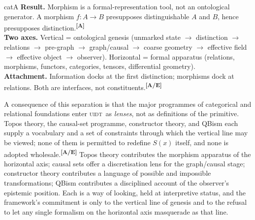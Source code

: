 \documentclass[12pt,a4paper,twoside]{article}
\theoremstyle{plain}
\theoremstyle{definition}
\theoremstyle{remark}
\newcommand{\UIDT}{\textsc{uidt}}
\newcommand{\catmark}[1]{\textsuperscript{\textsf{\textbf{[#1]}}}}
\begin{document}
\begin{evidencebox}{catA}
\textbf{Result.} Morphism is a formal-representation tool, not an ontological generator. A morphism $f\colon A\to B$ presupposes distinguishable $A$ and $B$,
hence presupposes distinction.\catmark{A}\\[0.3em]
\textbf{Two axes.} Vertical = ontological genesis (unmarked state $\to$ distinction $\to$ relations $\to$ pre-graph $\to$ graph/causal $\to$ coarse geometry $\to$ effective field $\to$ effective object $\to$ observer). Horizontal = formal apparatus (relations, morphisms, functors, categories,
tensors, differential geometry).\\[0.3em]
\textbf{Attachment.} Information docks at the first distinction; morphisms dock at relations. Both are interfaces, not constituents.\catmark{A/E}
\end{evidencebox}

\noindent A consequence of this separation is that the major programmes of categorical and relational foundations enter \UIDT\ as \emph{lenses}, not as definitions of the primitive. Topos theory, the causal-set programme, constructor theory, and QBism each supply a vocabulary and a set of constraints through which the vertical line may be viewed; none of them is permitted to redefine $S(x)$ itself, and none is adopted wholesale.\catmark{A/E} Topos theory contributes the morphism apparatus of the horizontal axis; causal sets offer a discretisation lens for the graph/causal stage; constructor theory contributes a language of possible and impossible transformations; QBism contributes a disciplined account of the observer's epistemic position. Each is a way of looking, held at interpretive status, and the framework's commitment is only to the vertical line of genesis and to the refusal to let any single formalism on the horizontal axis masquerade as that line.


\end{document}
